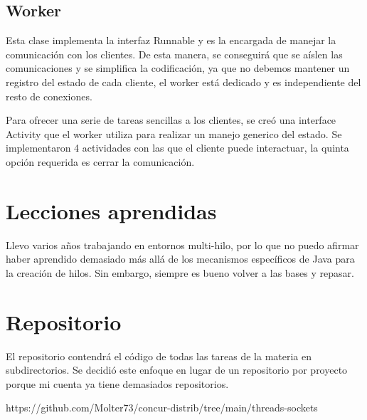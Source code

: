 \documentclass[a4paper]{article}
\begin{document}
\subsection{Worker}

Esta clase implementa la interfaz Runnable y es la encargada de manejar
la comunicación con los clientes. De esta manera, se conseguirá que se aíslen
las comunicaciones y se simplifica la codificación, ya que no debemos mantener
un registro del estado de cada cliente, el worker está dedicado y es
independiente del resto de conexiones.

Para ofrecer una serie de tareas sencillas a los clientes, se creó una
interface Activity que el worker utiliza para realizar un manejo generico
del estado. Se implementaron 4 actividades con las que el cliente puede
interactuar, la quinta opción requerida es cerrar la comunicación.

\begin{figure}[H]
    \centering
    \scalebox{.6}{
        
    }
\end{figure}

\section{Lecciones aprendidas}

Llevo varios años trabajando en entornos multi-hilo, por lo que no puedo
afirmar haber aprendido demasiado más allá de los mecanismos específicos de
Java para la creación de hilos. Sin embargo, siempre es bueno volver a las
bases y repasar.

\section{Repositorio}

El repositorio contendrá el código de todas las tareas de la materia en
subdirectorios. Se decidió este enfoque en lugar de un repositorio por proyecto
porque mi cuenta ya tiene demasiados repositorios.

https://github.com/Molter73/concur-distrib/tree/main/threads-sockets
\end{document}
